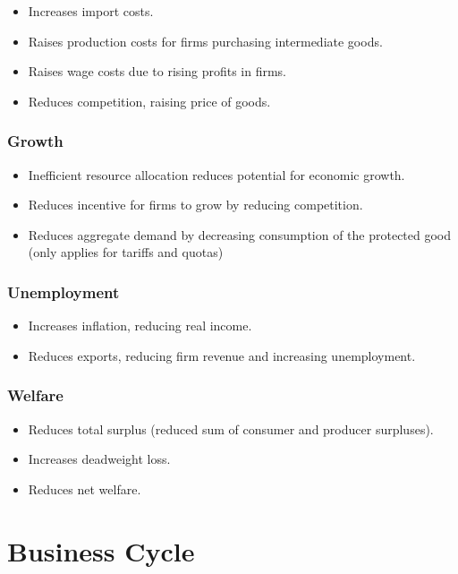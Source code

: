 \documentclass[a4paper,11pt]{report}
\begin{document}
\begin{itemize}
\item Increases import costs.
\item Raises production costs for firms purchasing intermediate goods.
\item Raises wage costs due to rising profits in firms.
\item Reduces competition, raising price of goods.
\end{itemize}

\subsection{Growth}

\begin{itemize}
\item Inefficient resource allocation reduces potential for economic growth.
\item Reduces incentive for firms to grow by reducing competition.
\item Reduces aggregate demand by decreasing consumption of the protected good
	(only applies for tariffs and quotas)
\end{itemize}

\subsection{Unemployment}

\begin{itemize}
\item Increases inflation, reducing real income.
\item Reduces exports, reducing firm revenue and increasing unemployment.
\end{itemize}

\subsection{Welfare}

\begin{itemize}
\item Reduces total surplus (reduced sum of consumer and producer surpluses).
\item Increases deadweight loss.
\item Reduces net welfare.
\end{itemize}




\chapter{Business Cycle}
\end{document}
